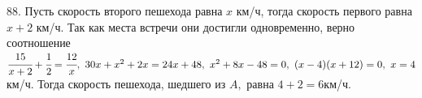 88. Пусть скорость второго пешехода равна $x$ км/ч, тогда скорость первого равна $x+2$ км/ч. Так как места встречи они достигли одновременно, верно соотношение $\cfrac{15}{x+2}+\cfrac{1}{2}=\cfrac{12}{x},\
30x+x^2+2x=24x+48,\ x^2+8x-48=0,\ (x-4)(x+12)=0,\ x=4$км/ч. Тогда скорость пешехода, шедшего из $A,$ равна $4+2=6$км/ч.
\newpage
